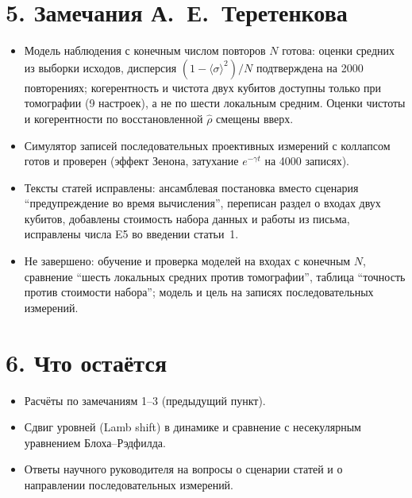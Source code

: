 \documentclass[11pt,a4paper]{article}
\begin{document}
\section*{5. Замечания А.~Е.~Теретенкова}
\begin{itemize}
\item Модель наблюдения с конечным числом повторов $N$ готова: оценки средних
  из выборки исходов, дисперсия $(1-\langle\sigma\rangle^2)/N$ подтверждена
  на 2000 повторениях; когерентность и чистота двух кубитов доступны только
  при томографии (9 настроек), а не по шести локальным средним. Оценки чистоты
  и когерентности по восстановленной $\hat\rho$ смещены вверх.
\item Симулятор записей последовательных проективных измерений с коллапсом
  готов и проверен (эффект Зенона, затухание $e^{-\gamma t}$ на 4000 записях).
\item Тексты статей исправлены: ансамблевая постановка вместо сценария
  ``предупреждение во время вычисления'', переписан раздел о входах двух
  кубитов, добавлены стоимость набора данных и работы из письма, исправлены
  числа E5 во введении статьи~1.
\item Не завершено: обучение и проверка моделей на входах с конечным $N$,
  сравнение ``шесть локальных средних против томографии'', таблица ``точность
  против стоимости набора''; модель и цель на записях последовательных
  измерений.
\end{itemize}

\section*{6. Что остаётся}
\begin{itemize}
\item Расчёты по замечаниям 1--3 (предыдущий пункт).
\item Сдвиг уровней (Lamb shift) в динамике и сравнение с несекулярным
  уравнением Блоха--Рэдфилда.
\item Ответы научного руководителя на вопросы о сценарии статей и о
  направлении последовательных измерений.
\end{itemize}
\end{document}
